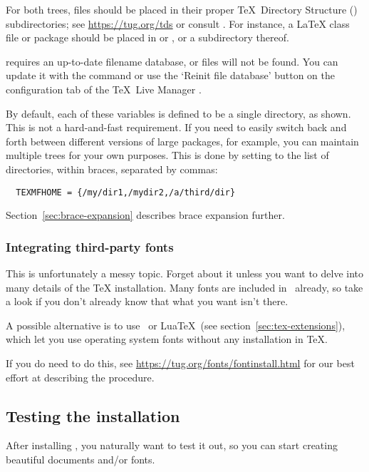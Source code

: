 \documentclass{article}
\begin{document}
For both trees, files should be placed in their proper \TeX\ Directory
Structure (\TDS) subdirectories; see \url{https://tug.org/tds} or consult
. For instance, a \LaTeX{} class file or
package should be placed in  or
, or a subdirectory thereof.

 requires an up-to-date filename database, or files
will not be found.  You can update it with the command
 or use the `Reinit file database' button on the
configuration tab of the \TeX\ Live Manager \GUI.

By default, each of these variables is defined to be a single directory,
as shown.  This is not a hard-and-fast requirement.  If you need to
easily switch back and forth between different versions of large
packages, for example, you can maintain multiple trees for your own
purposes.  This is done by setting  to the
list of directories, within braces, separated by commas:

\begin{verbatim}
  TEXMFHOME = {/my/dir1,/mydir2,/a/third/dir}
\end{verbatim}

Section~\ref{sec:brace-expansion} describes brace expansion further.


\subsubsection{Integrating third-party fonts}

This is unfortunately a messy topic.  Forget about it unless you want to
delve into many details of the \TeX{} installation.  Many fonts are
included in \TL\ already, so take a look if you don't already know 
that what you want isn't there.

A possible alternative is to use \XeTeX\ or Lua\TeX\ (see
section~\ref{sec:tex-extensions}), which let you use operating system
fonts without any installation in \TeX.

If you do need to do this, see
\url{https://tug.org/fonts/fontinstall.html} for our best effort at
describing the procedure.


\subsection{Testing the installation}
\label{sec:test-install}

After installing \TL{}, you naturally want to test it out, so you can
start creating beautiful documents and\slash or fonts.
\end{document}
